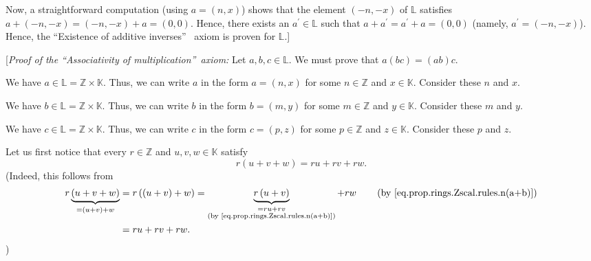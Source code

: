 \documentclass[paper=a4, fontsize=12pt]{scrartcl}%
\theoremstyle{plainsl}
\theoremstyle{definition}
\theoremstyle{remark}
\begin{document}
Now, a straightforward computation (using $a=\left(  n,x\right)  $) shows that
the element $\left(  -n,-x\right)  $ of $\mathbb{L}$ satisfies $a+\left(
-n,-x\right)  =\left(  -n,-x\right)  +a=\left(  0,0\right)  $. Hence, there
exists an $a^{\prime}\in\mathbb{L}$ such that $a+a^{\prime}=a^{\prime
}+a=\left(  0,0\right)  $ (namely, $a^{\prime}=\left(  -n,-x\right)  $).
Hence, the \textquotedblleft Existence of additive inverses\textquotedblright%
\ axiom is proven for $\mathbb{L}$.]

[\textit{Proof of the \textquotedblleft Associativity of
multiplication\textquotedblright\ axiom:} Let $a,b,c\in\mathbb{L}$. We must
prove that $a\left(  bc\right)  =\left(  ab\right)  c$.

We have $a\in\mathbb{L}=\mathbb{Z}\times\mathbb{K}$. Thus, we can write $a$ in
the form $a=\left(  n,x\right)  $ for some $n\in\mathbb{Z}$ and $x\in
\mathbb{K}$. Consider these $n$ and $x$.

We have $b\in\mathbb{L}=\mathbb{Z}\times\mathbb{K}$. Thus, we can write $b$ in
the form $b=\left(  m,y\right)  $ for some $m\in\mathbb{Z}$ and $y\in
\mathbb{K}$. Consider these $m$ and $y$.

We have $c\in\mathbb{L}=\mathbb{Z}\times\mathbb{K}$. Thus, we can write $c$ in
the form $c=\left(  p,z\right)  $ for some $p\in\mathbb{Z}$ and $z\in
\mathbb{K}$. Consider these $p$ and $z$.

Let us first notice that every $r\in\mathbb{Z}$ and $u,v,w\in\mathbb{K}$
satisfy
\begin{equation}
r\left(  u+v+w\right)  =ru+rv+rw.
\label{sol.ring.dorroh.assoc-mul.pf.r(u+v+w)}%
\end{equation}
(Indeed, this follows from%
\begin{align*}
r\underbrace{\left(  u+v+w\right)  }_{=\left(  u+v\right)  +w}  &  =r\left(
\left(  u+v\right)  +w\right)  =\underbrace{r\left(  u+v\right)
}_{\substack{=ru+rv\\\text{(by \eqref{eq.prop.rings.Zscal.rules.n(a+b)})}%
}}+rw\qquad\left(  \text{by \eqref{eq.prop.rings.Zscal.rules.n(a+b)}}\right)
\\
&  =ru+rv+rw.
\end{align*}
)
\end{document}
